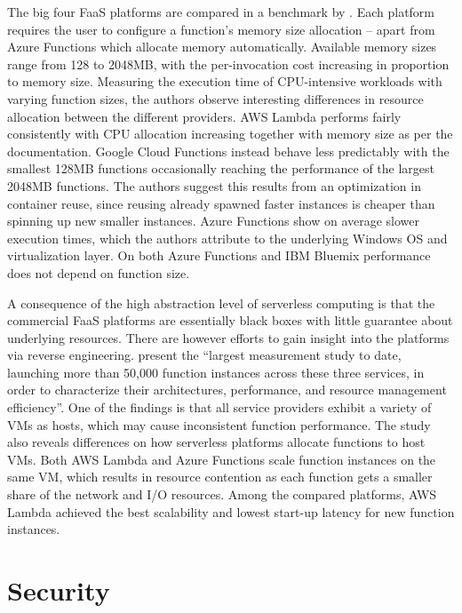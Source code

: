 The big four FaaS platforms are compared in a benchmark by \textcite{malawski18benchmark}. Each platform requires the user to configure a function's memory size allocation -- apart from Azure Functions which allocate memory automatically. Available memory sizes range from 128 to 2048MB, with the per-invocation cost increasing in proportion to memory size. Measuring the execution time of CPU-intensive workloads with varying function sizes, the authors observe interesting differences in resource allocation between the different providers. AWS Lambda performs fairly consistently with CPU allocation increasing together with memory size as per the documentation. Google Cloud Functions instead behave less predictably with the smallest 128MB functions occasionally reaching the performance of the largest 2048MB functions. The authors suggest this results from an optimization in container reuse, since reusing already spawned faster instances is cheaper than spinning up new smaller instances. Azure Functions show on average slower execution times, which the authors attribute to the underlying Windows OS and virtualization layer. On both Azure Functions and IBM Bluemix performance does not depend on function size.

A consequence of the high abstraction level of serverless computing is that the commercial FaaS platforms are essentially black boxes with little guarantee about underlying resources. There are however efforts to gain insight into the platforms via reverse engineering. \textcite{wang18peekingbehindcurtains} present the ``largest measurement study to date, launching more than 50,000 function instances across these three services, in order to characterize their architectures, performance, and resource management efficiency''. One of the findings is that all service providers exhibit a variety of VMs as hosts, which may cause inconsistent function performance. The study also reveals differences on how serverless platforms allocate functions to host VMs. Both AWS Lambda and Azure Functions scale function instances on the same VM, which results in resource contention as each function gets a smaller share of the network and I/O resources. Among the compared platforms, AWS Lambda achieved the best scalability and lowest start-up latency for new function instances.

\section{Security} \label{sec:security}

